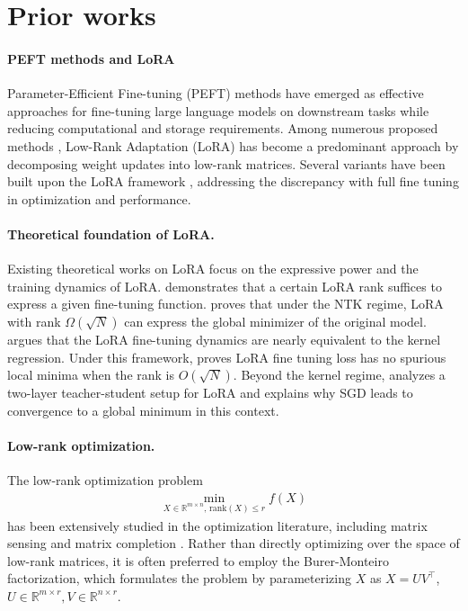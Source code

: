 \section{Prior works}
\label{sec::1.1} 
\paragraph{PEFT methods and LoRA}
Parameter-Efficient Fine-tuning (PEFT) methods have emerged as effective approaches for fine-tuning large language models on downstream tasks while reducing computational and storage requirements. Among numerous proposed methods \cite{ben-zaken-etal-2022-bitfit,li-liang-2021-prefix,lester-etal-2021-power}, Low-Rank Adaptation (LoRA) \cite{hu2022lora} has become a predominant approach by decomposing weight updates into low-rank matrices. Several variants have been built upon the LoRA framework \cite{dettmers2023qlora,wang2024loraprolowrankadaptersproperly,liu2024dora}, addressing the discrepancy with full fine tuning in optimization and performance.

\paragraph{Theoretical foundation of LoRA.}
Existing theoretical works on LoRA focus on the expressive power and the training dynamics of LoRA.  \citet{zeng2024the} demonstrates that a certain LoRA rank suffices to express a given fine-tuning function. \citet{jang2024lora} proves that under the NTK regime, LoRA with rank $\Omega (\sqrt{N})$ can express the global minimizer of the original model. \citet{pmlr-v202-malladi23a} argues that the LoRA fine-tuning dynamics are nearly equivalent to the kernel regression. Under this framework, \citet{jang2024lora} proves LoRA fine tuning loss has no spurious local minima when the rank is $O(\sqrt{N})$. Beyond the kernel regime, \citet{dayi2024gradient} analyzes a two-layer teacher-student setup for LoRA and explains why SGD leads to convergence to a global minimum in this context.








\paragraph{Low-rank optimization.}
The low-rank optimization problem 
\vspace{-0.2in}
\begin{align*}
    \min_{X\in \mathbb{R}^{m\times n}, \,\mathrm{rank}(X)\le r} f(X)
\end{align*}
has been extensively studied in the optimization literature, including matrix sensing  \cite{doi:10.1137/070697835} and matrix completion \cite{10.1145/2184319.2184343}. 
Rather than directly optimizing over the space of low-rank matrices, it is often preferred to employ the Burer-Monteiro factorization\cite{Burer2003ANP}, which formulates the problem by parameterizing $X$ as $X=UV^\intercal$, $U\in \mathbb{R}^{m\times r}, V\in \mathbb{R}^{n\times r}$.





